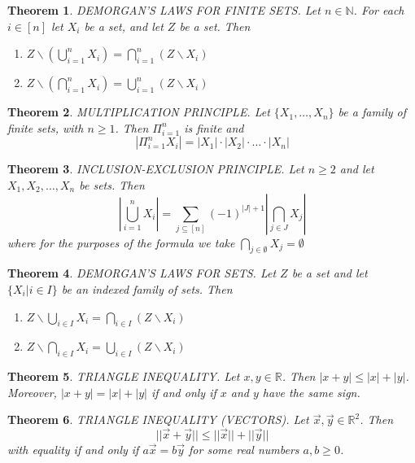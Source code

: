 \documentclass[12pt]{article}
\newtheorem{theorem}{Theorem}
\newcommand{\ba}{\backslash}
\newcommand{\R}{\mathbb{R}}
\newcommand{\N}{\mathbb{N}}
\begin{document}
\begin{theorem}
DEMORGAN'S LAWS FOR FINITE SETS. Let $n \in \N$. For each $i \in [n]$ let $X_i$ be a set, and let $Z$ be a set. Then
\begin{enumerate}
    \item $Z \ba (\bigcup_{i = 1}^{n}X_i) = \bigcap_{i = 1}^{n}(Z \ba X_i)$
    \item $Z \ba (\bigcap_{i = 1}^{n}X_i) = \bigcup_{i = 1}^{n}(Z \ba X_i)$
\end{enumerate}
\end{theorem}


\begin{theorem}
MULTIPLICATION PRINCIPLE. Let $\{X_1, \dots, X_n\}$ be a family of finite sets, with $n \geq 1$. Then $\Pi_{i=1}^{n}$ is finite and
$$|\Pi_{i = 1}^{n}X_i| = |X_1| \cdot |X_2| \cdot \dots \cdot |X_n|$$
\end{theorem}


\begin{theorem}
INCLUSION-EXCLUSION PRINCIPLE. Let $n \geq 2$ and let $X_1, X_2, \dots, X_n$ be sets. Then 
$$|\bigcup_{i=1}^{n}X_i| = \sum_{j \subseteq [n]} (-1)^{|J|+1}|\bigcap_{j \in J} X_j|$$
where for the purposes of the formula we take $\bigcap_{j \in \emptyset}X_j = \emptyset$
\end{theorem}


\begin{theorem}
DEMORGAN'S LAWS FOR SETS. Let $Z$ be a set and let $\{X_i|i \in I\}$ be an indexed family of sets. Then
\begin{enumerate}
    \item $Z\ba \bigcup_{i \in I}X_i = \bigcap_{i \in I}(Z \ba X_i)$
    \item $Z\ba \bigcap_{i \in I}X_i = \bigcup_{i \in I}(Z \ba X_i)$
\end{enumerate}
\end{theorem}


\begin{theorem}
TRIANGLE INEQUALITY. Let $x, y \in \R$. Then $|x+y| \leq |x| + |y|$. Moreover, $|x + y| = |x| + |y|$ if and only if $x$ and $y$ have the same sign. 
\end{theorem}


\begin{theorem}
TRIANGLE INEQUALITY (VECTORS). Let $\vec{x}, \vec{y} \in \R^2$. Then
 $$||\vec{x}+\vec{y}|| \leq ||\vec{x}|| + ||\vec{y}||$$
with equality if and only if $a\vec{x} = b\vec{y}$ for some real numbers $a, b \geq 0$. 
\end{theorem}
\end{document}
